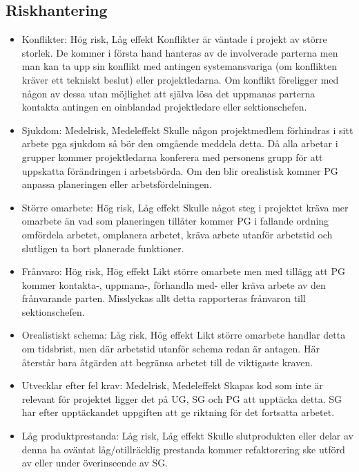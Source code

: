 \documentclass[paper=a4, fontsize=11pt,twoside]{article}
\begin{document}
\subsection*{Riskhantering}
\begin{itemize}
\item Konflikter: Hög risk, Låg effekt 
Konflikter är väntade i projekt av större storlek. De kommer i första hand hanteras av de involverade parterna men man kan ta upp sin konflikt med antingen systemansvariga (om konflikten kräver ett tekniskt beslut) eller projektledarna. Om konflikt föreligger med någon av dessa utan möjlighet att själva lösa det uppmanas parterna kontakta antingen en oinblandad projektledare eller sektionschefen.

\item Sjukdom: Medelrisk, Medeleffekt
Skulle någon projektmedlem förhindras i sitt arbete pga sjukdom så bör den omgående meddela detta. Då alla arbetar i grupper kommer projektledarna konferera med personens grupp för att uppskatta förändringen i arbetsbörda. Om den blir orealistisk kommer PG anpassa planeringen eller arbetsfördelningen.

\item Större omarbete: Hög risk, Låg effekt
Skulle något steg i projektet kräva mer omarbete än vad som planeringen tillåter kommer PG i fallande ordning omfördela arbetet, omplanera arbetet, kräva arbete utanför arbetstid och slutligen ta bort planerade funktioner.

\item Frånvaro: Hög risk, Hög effekt
Likt större omarbete men med tillägg att PG kommer kontakta-, uppmana-, förhandla med- eller kräva arbete av den frånvarande parten. Misslyckas allt detta rapporteras frånvaron till sektionschefen.

\item Orealistiskt schema: Låg risk, Hög effekt
Likt större omarbete handlar detta om tidsbrist, men där arbetstid utanför schema redan är antagen. Här återstår bara åtgärden att begränsa arbetet till de viktigaste kraven.

\item Utvecklar efter fel krav: Medelrisk, Medeleffekt
Skapas kod som inte är relevant för projektet ligger det på UG, SG och PG att upptäcka detta. SG har efter upptäckandet uppgiften att ge riktning för det fortsatta arbetet.

\item Låg produktprestanda: Låg risk, Låg effekt
Skulle slutprodukten eller delar av denna ha oväntat låg/otillräcklig prestanda kommer refaktorering ske utförd av eller under överinseende av SG. 


\end{itemize}
\end{document}
